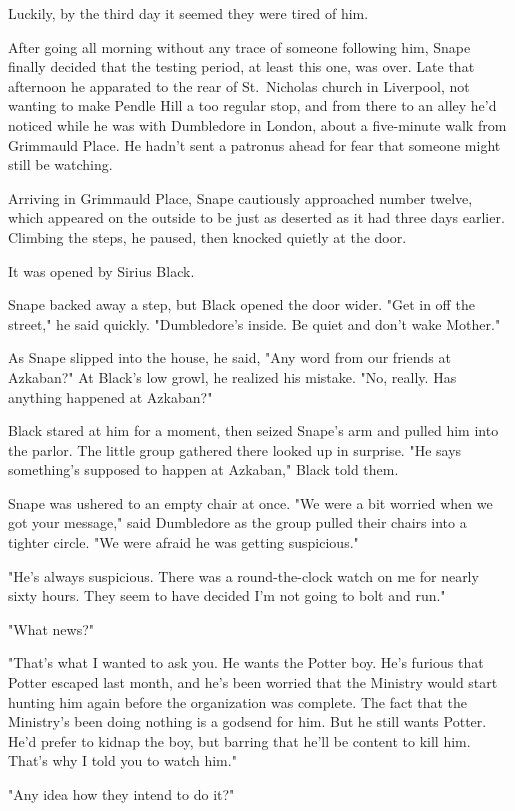 Luckily, by the third day it seemed they were tired of him.

After going all morning without any trace of someone following him, Snape finally decided that the testing period, at least this one, was over. Late that afternoon he apparated to the rear of St.~Nicholas church in Liverpool, not wanting to make Pendle Hill a too regular stop, and from there to an alley he'd noticed while he was with Dumbledore in London, about a five-minute walk from Grimmauld Place. He hadn't sent a patronus ahead for fear that someone might still be watching.

Arriving in Grimmauld Place, Snape cautiously approached number twelve, which appeared on the outside to be just as deserted as it had three days earlier. Climbing the steps, he paused, then knocked quietly at the door.

It was opened by Sirius Black.

Snape backed away a step, but Black opened the door wider. "Get in off the street," he said quickly. "Dumbledore's inside. Be quiet and don't wake Mother."

As Snape slipped into the house, he said, "Any word from our friends at Azkaban?" At Black's low growl, he realized his mistake. "No, really. Has anything happened at Azkaban?"

Black stared at him for a moment, then seized Snape's arm and pulled him into the parlor. The little group gathered there looked up in surprise. "He says something's supposed to happen at Azkaban," Black told them.

Snape was ushered to an empty chair at once. "We were a bit worried when we got your message," said Dumbledore as the group pulled their chairs into a tighter circle. "We were afraid he was getting suspicious."

"He's always suspicious. There was a round-the-clock watch on me for nearly sixty hours. They seem to have decided I'm not going to bolt and run."

"What news?"

"That's what I wanted to ask you. He wants the Potter boy. He's furious that Potter escaped last month, and he's been worried that the Ministry would start hunting him again before the organization was complete. The fact that the Ministry's been doing nothing is a godsend for him. But he still wants Potter. He'd prefer to kidnap the boy, but barring that he'll be content to kill him. That's why I told you to watch him."

"Any idea how they intend to do it?"

